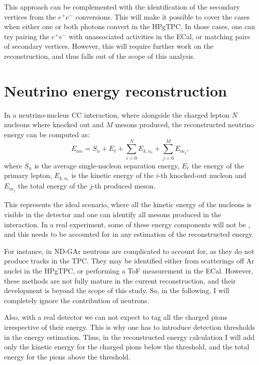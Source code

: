 This approach can be complemented with the identification of the secondary vertices from the $e^{+}e^{-}$ conversions. This will make it possible to cover the cases when either one or both photons convert in the HPgTPC. In those cases, one can try pairing the $e^{+}e^{-}$ with unassociated activities in the ECal, or matching pairs of secondary vertices. However, this will require further work on the reconstruction, and thus falls out of the scope of this analysis.

\section{Neutrino energy reconstruction}

In a neutrino-nucleus CC interaction, where alongside the charged lepton $N$ nucleons where knocked out and $M$ mesons produced, the reconstructed neutrino energy can be computed as:
\begin{equation}
    E_{\mathrm{rec}} = S_{n} + E_{\ell} + \sum_{i=0}^{N} E_{k,n_{i}} + \sum_{j=0}^{M} E_{m_{j}},
\end{equation}
where $S_{n}$ is the average single-nucleon separation energy, $E_{\ell}$ the energy of the primary lepton, $E_{k,n_{i}}$ is the kinetic energy of the $i$-th knocked-out nucleon and $E_{m_{j}}$ the total energy of the $j$-th produced meson.

This represents the ideal scenario, where all the kinetic energy of the nucleons is visible in the detector and one can identify all mesons produced in the interaction. In a real experiment, some of these energy components will not be , and this needs to be accounted for in any estimation of the reconstructed energy.

For instance, in ND-GAr neutrons are complicated to account for, as they do not produce tracks in the TPC. They may be identified either from scatterings off Ar nuclei in the HPgTPC, or performing a ToF measurement in the ECal. However, these methods are not fully mature in the current reconstruction, and their development is beyond the scope of this study. So, in the following, I will completely ignore the contribution of neutrons.

Also, with a real detector we can not expect to tag all the charged pions irrespective of their energy. This is why one has to introduce detection thresholds in the energy estimation. Thus, in the reconstructed energy calculation I will add only the kinetic energy for the charged pions below the threshold, and the total energy for the  pions above the threshold.

